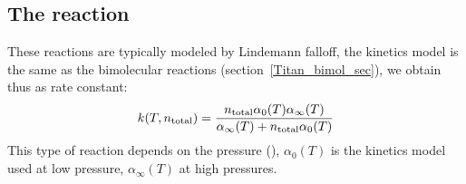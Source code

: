 \subsection{The reaction}
\begin{chemequation}
\end{chemequation}
These reactions are typically modeled by Lindemann falloff,
the kinetics model is the same as the bimolecular reactions
(section~\ref{Titan_bimol_sec}), we obtain thus as rate constant:
\begin{equation}
k(T,n_\text{total}) = \frac{n_\text{total} \alpha_0(T) \alpha_\infty(T)}{\alpha_\infty(T) + n_\text{total} \alpha_0(T)}
\end{equation}
This type of reaction depends on the pressure (\concAtm),
$\alpha_0(T)$ is the kinetics model used at low pressure,
$\alpha_\infty(T)$ at high pressures.
